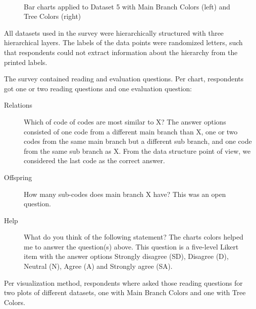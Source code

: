 \documentclass[journal]{vgtc}                %
\begin{document}
\begin{figure}[tb]
  \centering
  \mbox{
  }
  \caption{Bar charts applied to Dataset 5 with Main Branch Colors (left) and Tree Colors (right)}\label{fig:barSvy}

\end{figure}

All datasets used in the survey were hierarchically structured with three hierarchical layers. The labels of the data points were randomized letters, such that respondents could not extract information about the hierarchy from the printed labels.

The survey contained reading and evaluation questions. Per chart, respondents got one or two reading questions and one evaluation question:
\begin{description}
\item[Relations] Which of code of codes are most similar to X? The answer options consisted of one code from a different main branch than X, one or two codes from the same main branch but a different sub branch, and one code from the same sub branch as X. From the data structure point of view, we considered the last code as the correct answer.
\item[Offspring] How many sub-codes does main branch X have? This was an open question.
\item[Help] What do you think of the following statement? The charts colors helped me to answer the question(s) above. This question is a five-level Likert item with the answer options Strongly disagree (SD), Disagree (D), Neutral (N), Agree (A) and Strongly agree (SA).
\end{description}
Per visualization method, respondents where asked those reading questions for two plots of different datasets, one with Main Branch Colors and one with Tree Colors. 
\end{document}
